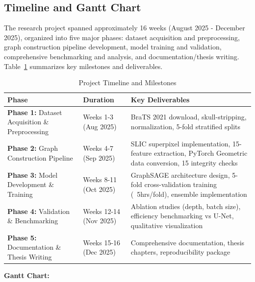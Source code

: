 \subsection{Timeline and Gantt Chart}

The research project spanned approximately 16 weeks (August 2025 - December 2025), organized into five major phases: dataset acquisition and preprocessing, graph construction pipeline development, model training and validation, comprehensive benchmarking and analysis, and documentation/thesis writing. Table~\ref{tab:timeline} summarizes key milestones and deliverables.

\begin{table}[htbp]
\caption{Project Timeline and Milestones}
\label{tab:timeline}
\begin{center}
\begin{tabularx}{\textwidth} { 
  | >{\raggedright\arraybackslash}X 
  | >{\centering\arraybackslash}X 
  | >{\raggedright\arraybackslash}X 
  | }
\hline
\textbf{Phase} & \textbf{Duration} & \textbf{Key Deliverables}\\
\hline
\textbf{Phase 1:} Dataset Acquisition \& Preprocessing & Weeks 1-3 (Aug 2025) & BraTS 2021 download, skull-stripping, normalization, 5-fold stratified splits\\
\hline
\textbf{Phase 2:} Graph Construction Pipeline & Weeks 4-7 (Sep 2025) & SLIC superpixel implementation, 15-feature extraction, PyTorch Geometric data conversion, 15 integrity checks\\
\hline
\textbf{Phase 3:} Model Development \& Training & Weeks 8-11 (Oct 2025) & GraphSAGE architecture design, 5-fold cross-validation training (~5hrs/fold), ensemble implementation\\
\hline
\textbf{Phase 4:} Validation \& Benchmarking & Weeks 12-14 (Nov 2025) & Ablation studies (depth, batch size), efficiency benchmarking vs U-Net, qualitative visualization\\
\hline
\textbf{Phase 5:} Documentation \& Thesis Writing & Weeks 15-16 (Dec 2025) & Comprehensive documentation, thesis chapters, reproducibility package\\
\hline
\end{tabularx}
\end{center}
\end{table}

\textbf{Gantt Chart:}

